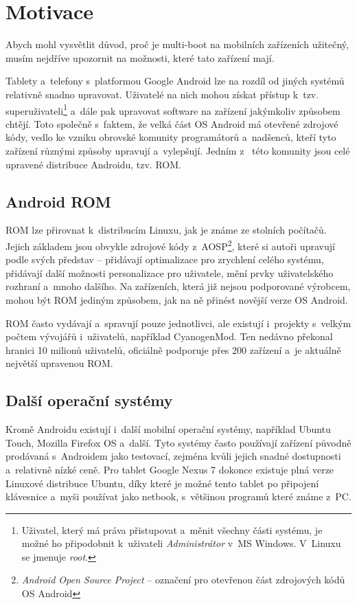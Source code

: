 \documentclass[12pt, a4paper, oneside]{article}
\newcommand{\It}{\textit}  %
\begin{document}
\section{Motivace}
Abych mohl vysvětlit důvod, proč je multi-boot na mobilních zařízeních užitečný, musím nejdříve upozornit na možnosti, které tato zařízení mají.

Tablety a~telefony s~platformou Google Android lze na rozdíl od jiných systémů relativně snadno upravovat. Uživatelé na nich mohou získat přístup k~tzv. superuživateli\footnote{Uživatel, který má práva přistupovat a~měnit všechny části systému, je možné ho připodobnit k~uživateli \It{Administrátor} v~MS Windows. V~Linuxu se jmenuje \It{root}.} a~dále pak upravovat software na zařízení jakýmkoliv způsobem chtějí. Toto společně s~faktem, že velká část OS Android má otevřené zdrojové kódy, vedlo ke vzniku obrovské komunity programátorů a~nadšenců, kteří tyto zařízení různými způsoby upravují a~vylepšují. Jedním z~ této komunity jsou celé upravené distribuce Androidu, tzv. ROM.

\subsection{Android ROM}
ROM lze přirovnat k~distribucím Linuxu, jak je známe ze stolních počítačů. Jejich základem jsou obvykle zdrojové kódy z~AOSP\cite{aosp}\footnote{\It{Android Open Source Project} -- označení pro otevřenou část zdrojových kódů OS Android}, které si autoři upravují podle svých představ -- přidávají optimalizace pro zrychlení celého systému, přidávají další možnosti personalizace pro uživatele, mění prvky uživatelského rozhraní a~mnoho dalšího. Na zařízeních, která již nejsou podporované výrobcem, mohou být ROM jediným způsobem, jak na ně přinést novější verze OS Android.

ROM často vydávají a~spravují pouze jednotlivci, ale existují i~projekty s~velkým počtem vývojářů i~uživatelů, například CyanogenMod\cite{CM}. Ten nedávno překonal hranici 10 milionů uživatelů, oficiálně podporuje přes 200 zařízení a~je aktuálně největší upravenou ROM.

\subsection{Další operační systémy}
Kromě Androidu existují i~další mobilní operační systémy, například Ubuntu Touch\cite{utouch}, Mozilla Firefox OS\cite{firefoxos} a~další. Tyto systémy často používají zařízení původně prodávaná s~Androidem jako testovací, zejména kvůli jejich snadné dostupnosti a~relativně nízké ceně. Pro tablet Google Nexus 7 dokonce existuje plná verze Linuxové distribuce Ubuntu, díky které je možné tento tablet po připojení klávesnice a~myši používat jako netbook, s~většinou programů které známe z~PC.
\end{document}
